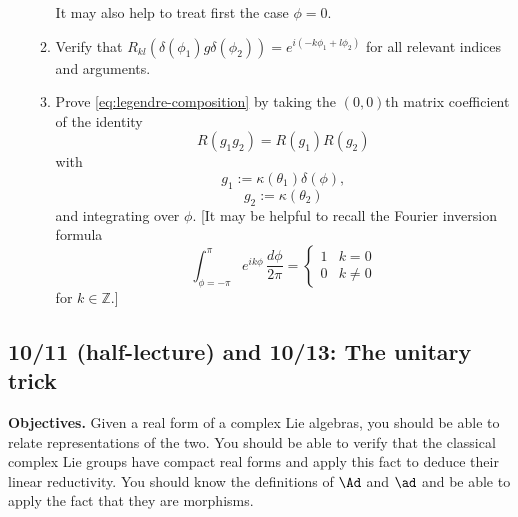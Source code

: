 \documentclass[reqno]{amsart} 
\begin{document}
\begin{homework}
\begin{enumerate}
\begin{enumerate}
\begin{enumerate}
      \end{enumerate}
      It may also help to treat first the case $\phi = 0$.
    \item Verify that $R_{k l}(\delta(\phi_1) g \delta(\phi_2)) = e^{i(-k \phi_1 + l \phi_2)}$ for all relevant indices and arguments.
    \item Prove \eqref{eq:legendre-composition} by taking the $(0,0)$th matrix coefficient of the identity
      \begin{equation*}
        R(g_1 g_2) = R(g_1) R(g_2)
      \end{equation*}
      with
      \begin{equation*}
g_1 := \kappa(\theta_1) \delta(\phi),
\end{equation*}
      \begin{equation*}
g_2 := \kappa(\theta_2)
\end{equation*}
 and integrating over $\phi$.  [It may be helpful to recall the Fourier inversion formula
      \begin{equation*}
        \int_{\phi = -\pi}^{\pi} e^{i k \phi} \, \frac{d \phi }{2 \pi } = 
\begin{cases}
          1 & k = 0 \\
          0 & k \neq 0
        \end{cases}
      \end{equation*}
      for $k \in \mathbb{Z}$.]
    \end{enumerate}
  \end{enumerate}
\end{homework}

\newpage
\subsection{10/11 (half-lecture) and 10/13: The unitary trick}
\label{sec:orgc4f94de}
\textbf{Objectives.}  Given a real form of a complex Lie algebras, you should be able to relate representations of the two.  You should be able to verify that the classical complex Lie groups have compact real forms and apply this fact to deduce their linear reductivity.  You should know the definitions of \(\Ad\) and \(\ad\) and be able to apply the fact that they are morphisms.
\end{document}
